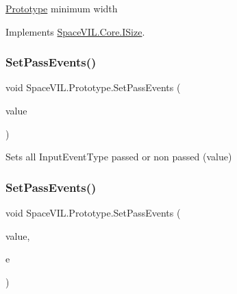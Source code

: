 \mbox{\hyperlink{class_space_v_i_l_1_1_prototype}{Prototype}} minimum width 



Implements \mbox{\hyperlink{interface_space_v_i_l_1_1_core_1_1_i_size}{Space\+V\+I\+L.\+Core.\+I\+Size}}.

\mbox{\label{class_space_v_i_l_1_1_prototype_ac2a3bb6f4b5c26dba5375eabf774de74}} 
\subsubsection{\texorpdfstring{Set\+Pass\+Events()}{SetPassEvents()}\hspace{0.1cm}{\footnotesize\ttfamily [1/2]}}
{\footnotesize\ttfamily void Space\+V\+I\+L.\+Prototype.\+Set\+Pass\+Events (\begin{DoxyParamCaption}\item[{bool}]{value }\end{DoxyParamCaption})\hspace{0.3cm}{\ttfamily [inline]}}



Sets all Input\+Event\+Type passed or non passed (value) 

\mbox{\label{class_space_v_i_l_1_1_prototype_a412b7eb2ed5ee06834127b06aa04a1fd}} 
\subsubsection{\texorpdfstring{Set\+Pass\+Events()}{SetPassEvents()}\hspace{0.1cm}{\footnotesize\ttfamily [2/2]}}
{\footnotesize\ttfamily void Space\+V\+I\+L.\+Prototype.\+Set\+Pass\+Events (\begin{DoxyParamCaption}\item[{bool}]{value,  }\item[{Input\+Event\+Type}]{e }\end{DoxyParamCaption})\hspace{0.3cm}{\ttfamily [inline]}}


